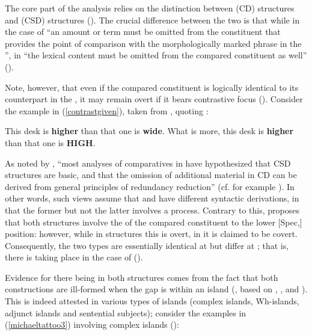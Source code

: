 The core part of the analysis relies on the distinction between  (CD) structures and  (CSD) structures (\citealt[553--554]{kennedy2002}). The crucial difference between the two is that while in the case of  ``an amount or  term must be omitted from the constituent that provides the point of comparison with the morphologically marked phrase in the '', in  ``the lexical content must be omitted from the compared constituent as well'' (\citealt[554]{kennedy2002}).

Note, however, that even if the compared constituent is logically identical to its counterpart in the , it may remain overt if it bears contrastive focus (\citealt[555]{kennedy2002}). Consider the example in (\ref{contrastgiven}), taken from \citet[555, ex. 5a]{kennedy2002}, quoting \citet{chomsky1977}:

\begin{exe}
\ex \label{contrastgiven}
\begin{xlist} 
 This desk is \textbf{higher} than that one is \textbf{wide}.
 What is more, this desk is \textbf{higher} than that one is \textbf{HIGH}.
\end{xlist}
\end{exe}

As noted by \citet[555]{kennedy2002}, ``most analyses of comparatives in  have hypothesized that CSD structures are basic, and that the omission of additional material in CD can be derived from general principles of redundancy reduction'' (cf. for example \citealt{lees1961}). In other words, such views assume that  and  have different syntactic derivations, in that the former but not the latter involves a  process. Contrary to this, \citet[555--556]{kennedy2002} proposes that both structures involve the  of the compared constituent to the lower [Spec,] position: however, while in  structures this  is overt, in  it is claimed to be covert. Consequently, the two types are essentially identical at  but differ at ; that is, there is  taking place in the case of  (\citealt[556]{kennedy2002}).

Evidence for there being  in both structures comes from the fact that both constructions are ill-formed when the gap is within an  island (\citealt[557--558]{kennedy2002}, based on \citealt{ross1967diss}, \citealt{huddleston1967}, \citealt{chomsky1977} and \citealt{postal1998}). This is indeed attested in various types of  islands (complex  islands, Wh-islands, adjunct islands and sentential subjects); consider the examples in (\ref{michaeltattoo3}) involving complex  islands (\citealt[558, ex. 9]{kennedy2002}):

